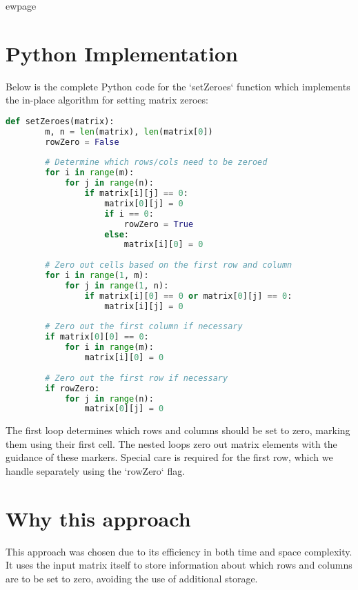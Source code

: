ewpage %
\section*{Python Implementation}

Below is the complete Python code for the `setZeroes` function which implements the in-place algorithm for setting matrix zeroes:

\begin{fullwidth}
\begin{lstlisting}[language=Python]
	def setZeroes(matrix):
	    m, n = len(matrix), len(matrix[0])
	    rowZero = False
	    
	    # Determine which rows/cols need to be zeroed 
	    for i in range(m):
	        for j in range(n):
	            if matrix[i][j] == 0:
	                matrix[0][j] = 0
	                if i == 0:
	                    rowZero = True
	                else:
	                    matrix[i][0] = 0
	                    
	    # Zero out cells based on the first row and column
	    for i in range(1, m):
	        for j in range(1, n):
	            if matrix[i][0] == 0 or matrix[0][j] == 0:
	                matrix[i][j] = 0
	                
	    # Zero out the first column if necessary
	    if matrix[0][0] == 0:
	        for i in range(m):
	            matrix[i][0] = 0
	            
	    # Zero out the first row if necessary
	    if rowZero:
	        for j in range(n):
	            matrix[0][j] = 0
\end{lstlisting}

\end{fullwidth}

The first loop determines which rows and columns should be set to zero, marking them using their first cell. The nested loops zero out matrix elements with the guidance of these markers. Special care is required for the first row, which we handle separately using the `rowZero` flag.

\section*{Why this approach}

This approach was chosen due to its efficiency in both time and space complexity. It uses the input matrix itself to store information about which rows and columns are to be set to zero, avoiding the use of additional storage.

